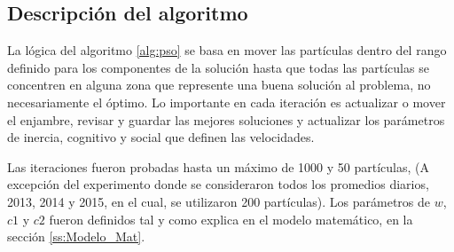 \subsection{Descripción del algoritmo}
La lógica del algoritmo \ref{alg:pso} se basa en mover las partículas dentro del rango definido para los componentes de la solución hasta que todas las partículas se concentren en alguna zona que represente una buena solución al problema, no necesariamente el óptimo. Lo importante en cada iteración es actualizar o mover el enjambre, revisar y guardar las mejores soluciones y actualizar los parámetros de inercia, cognitivo y social que definen las velocidades.

Las iteraciones fueron probadas hasta un máximo de 1000 y 50 partículas, (A excepción del experimento donde se consideraron todos los promedios diarios, 2013, 2014 y 2015, en el cual, se utilizaron 200 partículas). Los parámetros de $w$, $c1$ y $c2$ fueron definidos tal y como explica en el modelo matemático, en la sección \ref{ss:Modelo_Mat}.\\

